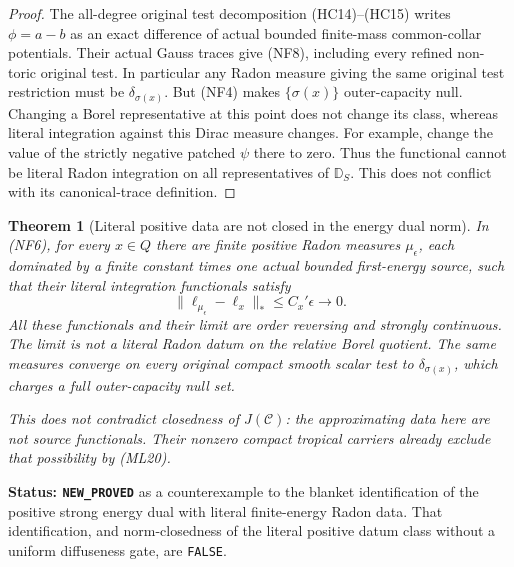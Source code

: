 \documentclass[11pt,a4paper]{article}
\numberwithin{equation}{section}
\newtheorem{theorem}{Theorem}[section]
\theoremstyle{definition}
\theoremstyle{remark}
\begin{document}
\begin{proof}
The all-degree original test decomposition (HC14)--(HC15)
writes $\phi=a-b$ as an exact difference of actual bounded
finite-mass common-collar potentials. Their actual Gauss
traces give (NF8), including every refined non-toric original
test. In particular any Radon measure giving the same
original test restriction must be $\delta_{\sigma(x)}$.
But (NF4) makes $\{\sigma(x)\}$ outer-capacity null.
Changing a Borel representative at this point does not
change its class, whereas literal integration against this
Dirac measure changes. For example, change the value of
the strictly negative patched $\psi$ there to zero.
Thus the functional cannot be literal Radon integration
on all representatives of $\mathbb D_S$. This does not
conflict with its canonical-trace definition.
\end{proof}

\begin{theorem}[Literal positive data are not closed in the energy dual norm]
\label{thm:r12-literal-dual-data-not-closed}
In (NF6), for every $x\in Q$ there are finite positive Radon
measures $\mu_\epsilon$, each dominated by a finite constant
times one actual bounded first-energy source, such that
their literal integration functionals satisfy
\[
               \|\ell_{\mu_\epsilon}-\ell_x\|_*
                                      \leq C_x'\epsilon\longrightarrow0.
 \tag{NF12}
\]
All these functionals and their limit are order reversing
and strongly continuous. The limit is not a literal Radon
datum on the relative Borel quotient. The same measures
converge on every original compact smooth scalar test to
$\delta_{\sigma(x)}$, which charges a full outer-capacity
null set.

This does not contradict closedness of $J(\mathscr C)$:
the approximating data here are not source functionals.
Their nonzero compact tropical carriers already exclude
that possibility by (ML20).
\end{theorem}

\noindent\textbf{Status: \texttt{NEW\_PROVED}} as a
counterexample to the blanket identification of the positive
strong energy dual with literal finite-energy Radon data.
That identification, and norm-closedness of the literal
positive datum class without a uniform diffuseness gate,
are \texttt{FALSE}.
\end{document}
